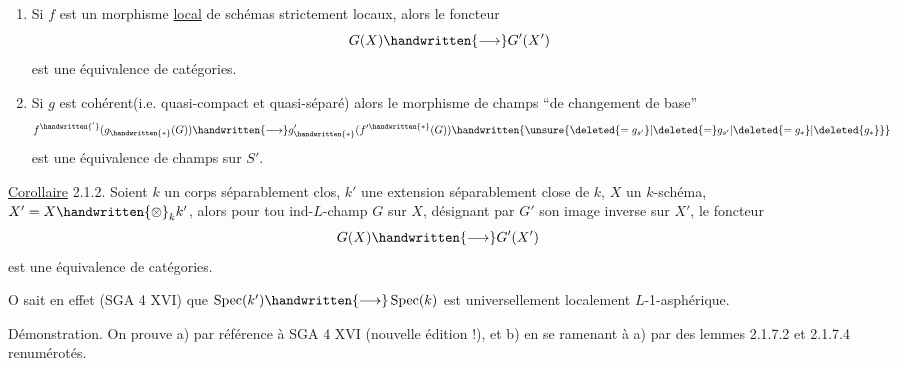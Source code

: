 \begin{enumerate}[label=\alph*)]
\item Si  $f$ est un morphisme  \uline{local} de schémas strictement locaux, alors le foncteur
\[
G(X)\handwritten{\longrightarrow}G'(X')
\]
est une équivalence de catégories.

\item Si $g$ est cohérent(i.e. quasi-compact et quasi-séparé) alors le morphisme de champs ``de changement de base''
\[
f^{\handwritten{'}}(g_{\handwritten{*}}(G))\handwritten{\longrightarrow}g'_{\handwritten{*}}(f'^{\handwritten{*}}(G))\handwritten{\unsure{\deleted{=g_{s'}}|\deleted{=}g_{s'}|\deleted{=g_*}|\deleted{g_*}}}
\]
est une équivalence de champs sur $S'$.
\end{enumerate}

\uline{Corollaire} 2.1.2. Soient $k$ un corps séparablement clos, $k'$ une extension séparablement close de $k$, $X$ un $k$-schéma, $X'=X\handwritten{\otimes}_k k'$, alors pour tou  ind-\uline{$L$}-champ $G$ sur $X$, désignant par $G'$ son image inverse sur $X'$, le foncteur
\[
G(X)\handwritten{\longrightarrow}G'(X')
\]
est une équivalence de catégories.

O sait en effet (SGA 4 XVI\quad\quad) que $\operatorname{Spec}(k')\handwritten{\longrightarrow}\operatorname{Spec}(k)$ est universellement localement \uline{$L$}-1-asphérique.

Démonstration. On prouve a) par référence à SGA 4 XVI (nouvelle édition !), et b) en se ramenant à a) par des lemmes 2.1.7.2 et 2.1.7.4 renumérotés.


